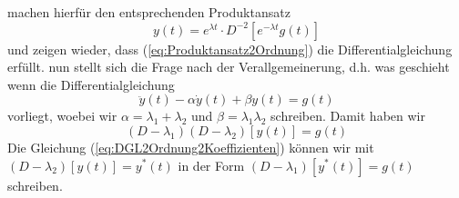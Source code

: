 machen hierfür den entsprechenden Produktansatz
\begin{equation}
  y(t)=e^{\lambda t}\cdot D^{-2}[e^{-\lambda t}g(t)]
  \label{eq:Produktansatz2Ordnung}
\end{equation}
und zeigen wieder, dass (\ref{eq:Produktansatz2Ordnung}) die
Differentialgleichung erfüllt. nun stellt sich die Frage nach der
Verallgemeinerung, d.h. was geschieht wenn die Differentialgleichung 
\begin{equation}
  \ddot{y}(t)-\alpha\dot{y}(t)+\beta y(t)=g(t)
  \label{eq:DGL2Ordnung2Koeffizienten}
\end{equation}
vorliegt, woebei wir $\alpha=\lambda_1+\lambda_2$ und $\beta=\lambda_1\lambda_2$
schreiben. Damit haben wir
\begin{equation}
  (D-\lambda_1)(D-\lambda_2)[y(t)]=g(t)
  \label{eq:DGG2KoeffizientenOperatorform}
\end{equation}
Die Gleichung (\ref{eq:DGL2Ordnung2Koeffizienten}) können wir mit $(D-\lambda_2)[y(t)]=y^*(t)$ 
in der Form $(D-\lambda_1)[y^*(t)]=g(t)$ schreiben.

